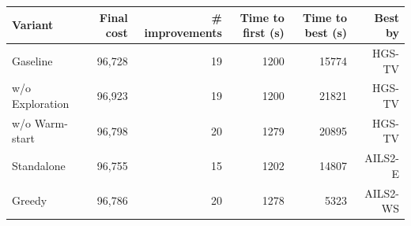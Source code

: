 \begin{tabular}{lrrrrr}
\toprule
Variant & Final cost & \# improvements & Time to first (s) & Time to best (s) & Best by \\
\midrule
Gaseline & 96,728 & 19 & 1200 & 15774 & HGS-TV \\
w/o Exploration & 96,923 & 19 & 1200 & 21821 & HGS-TV \\
w/o Warm-start & 96,798 & 20 & 1279 & 20895 & HGS-TV \\
Standalone & 96,755 & 15 & 1202 & 14807 & AILS2-E \\
Greedy & 96,786 & 20 & 1278 & 5323 & AILS2-WS \\
\bottomrule
\end{tabular}